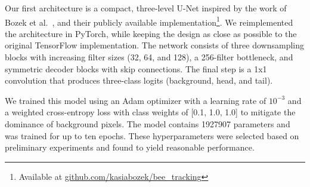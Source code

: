 Our first architecture is a compact, three-level U-Net inspired by the work of Bozek et al.~\cite{bozek2018pixel, bozek2021markerless}, and their publicly available implementation\footnote{Available at \href{https://github.com/kasiabozek/bee\_tracking}{github.com/kasiabozek/bee\_tracking}}.
We reimplemented the architecture in PyTorch, while keeping the design as close as possible to the original TensorFlow implementation.
The network consists of three downsampling blocks with increasing filter sizes (32, 64, and 128), a 256-filter bottleneck, and symmetric decoder blocks with skip connections.
The final step is a 1x1 convolution that produces three-class logits (background, head, and tail).

We trained this model using an Adam optimizer with a learning rate of $10^{-3}$ and a weighted cross-entropy loss with class weights of [0.1, 1.0, 1.0] to mitigate the dominance of background pixels.
The model contains \qty{1927907}{} parameters and was trained for up to ten epochs.
These hyperparameters were selected based on preliminary experiments and found to yield reasonable performance.